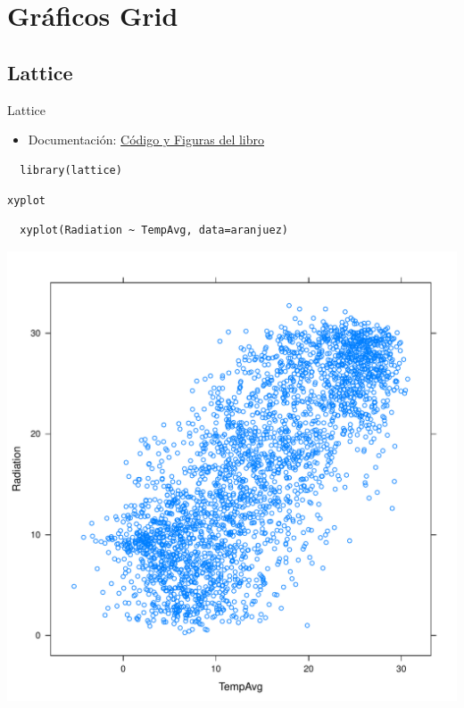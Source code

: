 \documentclass[xcolor={usenames,svgnames,dvipsnames}]{beamer}
\begin{document}
\section{Gráficos Grid}
\label{sec-2}

\subsection{Lattice}
\label{sec-2-1}

\begin{frame}[fragile,label=sec-2-1-1]{Lattice}
 \begin{itemize}
\item Documentación: \href{http://lmdvr.r-forge.r-project.org/figures/figures.html}{Código y Figuras del libro}
\end{itemize}

\lstset{language=R,label= ,caption= ,numbers=none}
\begin{lstlisting}
  library(lattice)
\end{lstlisting}
\end{frame}

\begin{frame}[fragile,label=sec-2-1-2]{\texttt{xyplot}}
 \lstset{language=R,label= ,caption= ,numbers=none}
\begin{lstlisting}
  xyplot(Radiation ~ TempAvg, data=aranjuez)
\end{lstlisting}
\end{frame}

\begin{frame}[label=sec-2-1-3]{}
\includegraphics[width=.9\linewidth]{figs/xyplot.pdf}
\end{frame}
\end{document}
